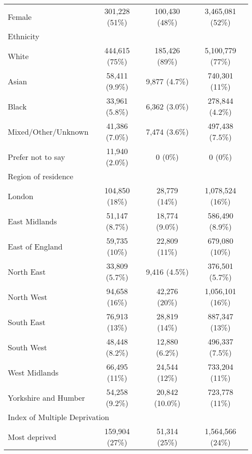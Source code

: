 \begin{longtable}[t]{lccc}
\hspace{1em}Female & 301,228 (51\%) & 100,430 (48\%) & 3,465,081 (52\%)\\
Ethnicity &  &  & \\
\hspace{1em}White & 444,615 (75\%) & 185,426 (89\%) & 5,100,779 (77\%)\\
\hspace{1em}Asian & 58,411 (9.9\%) & 9,877 (4.7\%) & 740,301 (11\%)\\
\hspace{1em}Black & 33,961 (5.8\%) & 6,362 (3.0\%) & 278,844 (4.2\%)\\
\hspace{1em}Mixed/Other/Unknown & 41,386 (7.0\%) & 7,474 (3.6\%) & 497,438 (7.5\%)\\
\hspace{1em}Prefer not to say & 11,940 (2.0\%) & 0 (0\%) & 0 (0\%)\\
Region of residence &  &  & \\
\hspace{1em}London & 104,850 (18\%) & 28,779 (14\%) & 1,078,524 (16\%)\\
\hspace{1em}East Midlands & 51,147 (8.7\%) & 18,774 (9.0\%) & 586,490 (8.9\%)\\
\hspace{1em}East of England & 59,735 (10\%) & 22,809 (11\%) & 679,080 (10\%)\\
\hspace{1em}North East & 33,809 (5.7\%) & 9,416 (4.5\%) & 376,501 (5.7\%)\\
\hspace{1em}North West & 94,658 (16\%) & 42,276 (20\%) & 1,056,101 (16\%)\\
\hspace{1em}South East & 76,913 (13\%) & 28,819 (14\%) & 887,347 (13\%)\\
\hspace{1em}South West & 48,448 (8.2\%) & 12,880 (6.2\%) & 496,337 (7.5\%)\\
\hspace{1em}West Midlands & 66,495 (11\%) & 24,544 (12\%) & 733,204 (11\%)\\
\hspace{1em}Yorkshire and Humber & 54,258 (9.2\%) & 20,842 (10.0\%) & 723,778 (11\%)\\
\multicolumn{3}{l}{Index of Multiple Deprivation}  & \\
\hspace{1em}Most deprived & 159,904 (27\%) & 51,314 (25\%) & 1,564,566 (24\%)\\

\end{longtable}
